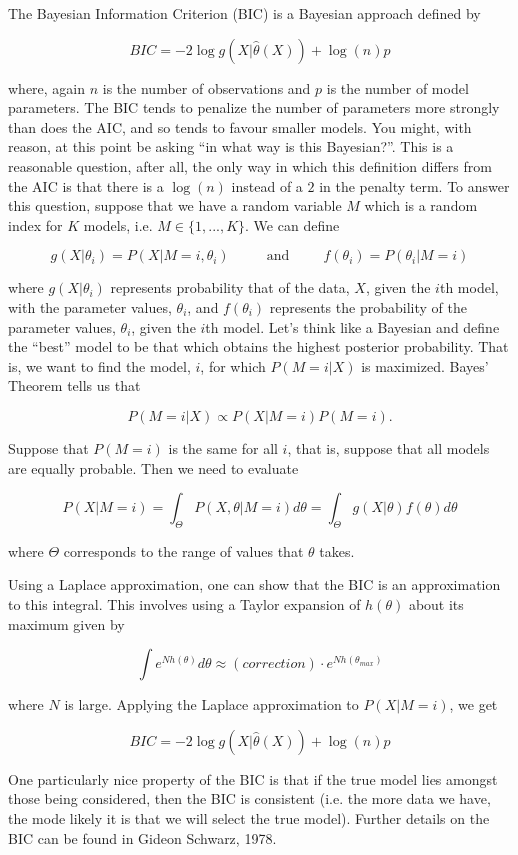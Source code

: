 The Bayesian Information Criterion (BIC) is a Bayesian approach defined by

$$BIC = -2 \log g(X | \hat{\theta}(X)) + \log (n) p$$

where, again $n$ is the number of observations and $p$ is the number of model parameters. The BIC tends to penalize the number of parameters more strongly than does the AIC, and so tends to favour smaller models. You might, with reason, at this point be asking ``in what way is this Bayesian?''. This is a reasonable question, after all, the only way in which this definition differs from the AIC is that there is a $\log(n)$ instead of a $2$ in the penalty term. To answer this question, suppose that we have a random variable $M$ which is a random index for $K$ models, i.e. $M \in \{1, ..., K\}$. We can define

$$g(X | \theta_i) = P(X | M = i, \theta_i) ~~~~~~~~~~~~ \text{and} ~~~~~~~~~~~ f(\theta_i) = P(\theta_i | M = i)$$

where $g(X | \theta_i)$ represents probability that of the data, $X$, given the $i$th model, with the parameter values, $\theta_i$, and $f(\theta_i)$ represents the probability of the parameter values, $\theta_i$, given the $i$th model. Let's think like a Bayesian and define the ``best'' model to be that which obtains the highest posterior probability. That is, we want to find the model, $i$, for which $P(M = i | X)$ is maximized. Bayes' Theorem tells us that

$$P(M = i | X) \propto P(X | M=i)P(M=i).$$

Suppose that $P(M = i)$ is the same for all $i$, that is, suppose that all models are equally probable. Then we need to evaluate

$$P(X | M = i) = \int_{\Theta} P(X, \theta | M = i) d\theta = \int_\Theta g(X | \theta) f(\theta) d\theta$$

where $\Theta$ corresponds to the range of values that $\theta$ takes.

Using a Laplace approximation, one can show that the BIC is an approximation to this integral. This involves using a Taylor expansion of $h(\theta)$ about its maximum given by

$$\int e^{Nh(\theta)} d\theta \approx (correction) \cdot e^{Nh(\theta_{max})}$$

where $N$ is large. Applying the Laplace approximation to $P(X | M = i)$, we get


$$BIC = -2 \log g(X | \hat{\theta}(X)) + \log(n) p$$


One particularly nice property of the BIC is that if the true model lies amongst those being considered, then the BIC is consistent (i.e. the more data we have, the mode likely it is that we will select the true model). Further details on the BIC can be found in Gideon Schwarz, 1978.



